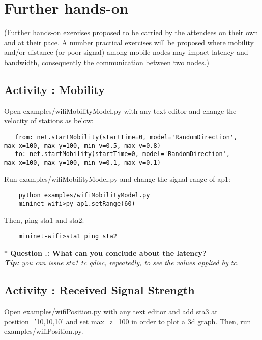 \section{Further hands-on}
(Further hands-on exercises proposed to be carried by the attendees on their own and at their pace.
	A number practical exercises will be proposed where mobility and/or distance (or poor signal) among mobile nodes may impact latency and bandwidth, consequently the communication between two nodes.)


\setcounter{question}{1}
\subsection{Activity \themycounter{}: Mobility}  


\noindent Open examples/wifiMobilityModel.py with any text editor and change the velocity of stations as below:
\begin{verbatim}
   from: net.startMobility(startTime=0, model='RandomDirection', max_x=100, max_y=100, min_v=0.5, max_v=0.8)
   to: net.startMobility(startTime=0, model='RandomDirection', max_x=100, max_y=100, min_v=0.1, max_v=0.1)
\end{verbatim}

\noindent Run examples/wifiMobilityModel.py and change the signal range of ap1:
\begin{verbatim}
    python examples/wifiMobilityModel.py
    mininet-wifi>py ap1.setRange(60)
\end{verbatim}

\noindent Then, ping sta1 and sta2:
\begin{verbatim}
    mininet-wifi>sta1 ping sta2
\end{verbatim}

\noindent \textbf{$\ast$ Question \themycounter.\thequestion{}: What can you conclude about the latency?}\\
\textit{\textbf{Tip:} you can issue sta1 tc qdisc, repeatedly, to see the values applied by tc.}


\setcounter{question}{1}
\subsection{Activity \themycounter{}: Received Signal Strength} 

\noindent Open examples/wifiPosition.py with any text editor and add sta3 at position='10,10,10' and set max\_z=100 in order to plot a 3d graph. Then, run examples/wifiPosition.py.\\

